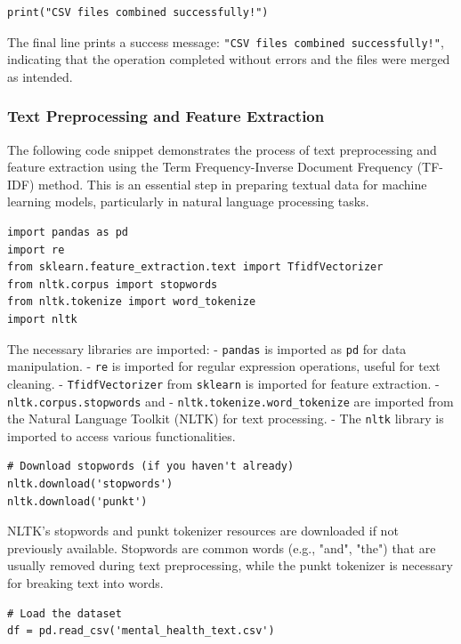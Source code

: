 \begin{verbatim}
print("CSV files combined successfully!")
\end{verbatim}

\noindent
The final line prints a success message: \texttt{"CSV files combined successfully!"}, indicating that the operation completed without errors and the files were merged as intended.


\subsubsection{Text Preprocessing and Feature Extraction}

\noindent
The following code snippet demonstrates the process of text preprocessing and feature extraction using the Term Frequency-Inverse Document Frequency (TF-IDF) method. This is an essential step in preparing textual data for machine learning models, particularly in natural language processing tasks.

\begin{verbatim}
import pandas as pd
import re
from sklearn.feature_extraction.text import TfidfVectorizer
from nltk.corpus import stopwords
from nltk.tokenize import word_tokenize
import nltk
\end{verbatim}

\noindent
The necessary libraries are imported:
- \texttt{pandas} is imported as \texttt{pd} for data manipulation.
- \texttt{re} is imported for regular expression operations, useful for text cleaning.
- \texttt{TfidfVectorizer} from \texttt{sklearn} is imported for feature extraction.
- \texttt{nltk.corpus.stopwords} and 
- \texttt{nltk.tokenize.word\_tokenize} are imported from the Natural Language Toolkit (NLTK) for text processing.
- The \texttt{nltk} library is imported to access various functionalities.

\begin{verbatim}
# Download stopwords (if you haven't already)
nltk.download('stopwords')
nltk.download('punkt')
\end{verbatim}

\noindent
NLTK’s stopwords and punkt tokenizer resources are downloaded if not previously available. Stopwords are common words (e.g., "and", "the") that are usually removed during text preprocessing, while the punkt tokenizer is necessary for breaking text into words.

\begin{verbatim}
# Load the dataset
df = pd.read_csv('mental_health_text.csv')
\end{verbatim}

